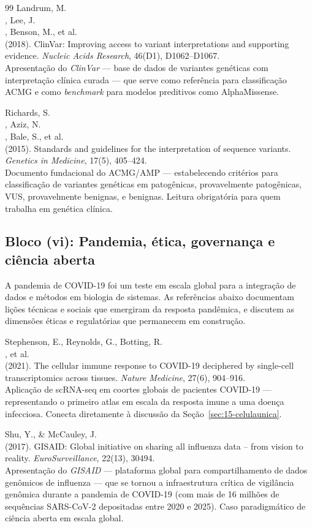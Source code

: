 \begin{thebibliography}{99}
 Landrum, M.\\, Lee, J.\\, Benson, M., et al.\\ (2018). ClinVar: Improving access to variant interpretations and supporting evidence. \emph{Nucleic Acids Research}, 46(D1), D1062--D1067.\\ Apresentação do \emph{ClinVar} --- base de dados de variantes genéticas com interpretação clínica curada --- que serve como referência para classificação ACMG e como \emph{benchmark} para modelos preditivos como AlphaMissense.

 Richards, S.\\, Aziz, N.\\, Bale, S., et al.\\ (2015). Standards and guidelines for the interpretation of sequence variants. \emph{Genetics in Medicine}, 17(5), 405--424.\\ Documento fundacional do ACMG/AMP --- estabelecendo critérios para classificação de variantes genéticas em patogênicas, provavelmente patogênicas, VUS, provavelmente benignas, e benignas. Leitura obrigatória para quem trabalha em genética clínica.

\subsection*{Bloco (vi): Pandemia, ética, governança e ciência aberta}

A pandemia de COVID-19 foi um teste em escala global para a integração de dados e métodos em biologia de sistemas. As referências abaixo documentam lições técnicas e sociais que emergiram da resposta pandêmica, e discutem as dimensões éticas e regulatórias que permanecem em construção.

 Stephenson, E., Reynolds, G., Botting, R.\\, et al.\\ (2021). The cellular immune response to COVID-19 deciphered by single-cell transcriptomics across tissues. \emph{Nature Medicine}, 27(6), 904--916.\\ Aplicação de scRNA-seq em coortes globais de pacientes COVID-19 --- representando o primeiro atlas em escala da resposta imune a uma doença infecciosa. Conecta diretamente à discussão da Seção~\ref{sec:15-celulaunica}.

 Shu, Y., \& McCauley, J.\\ (2017). GISAID: Global initiative on sharing all influenza data -- from vision to reality. \emph{EuroSurveillance}, 22(13), 30494.\\ Apresentação do \emph{GISAID} --- plataforma global para compartilhamento de dados genômicos de influenza --- que se tornou a infraestrutura crítica de vigilância genômica durante a pandemia de COVID-19 (com mais de 16 milhões de sequências SARS-CoV-2 depositadas entre 2020 e 2025). Caso paradigmático de ciência aberta em escala global.


\end{thebibliography}
